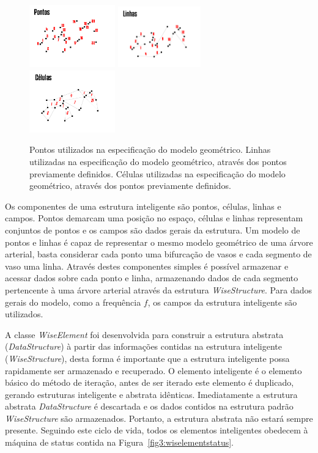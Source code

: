 \documentclass[a4paper,12pt]{monografia}
\theoremstyle{plain}
\theoremstyle{definition}
\theoremstyle{remark}
\begin{document}
\begin{figure}[!htbp]
	\includegraphics[width=0.33\textwidth]{Figures/WiseElementPoints.png}
	\includegraphics[width=0.32\textwidth]{Figures/WiseElementLines.png}
	\includegraphics[width=0.33\textwidth]{Figures/WiseElementCells.png}
	\caption{Pontos utilizados na especificação do modelo geométrico. Linhas utilizadas na especificação do modelo geométrico, através dos pontos previamente definidos. Células utilizadas na especificação do modelo geométrico, através dos pontos previamente definidos.}
	\label{fig2:wiselementstructs}
\end{figure}

Os componentes de uma estrutura inteligente são pontos, células, linhas e campos. Pontos demarcam uma posição no espaço, células e linhas representam conjuntos de pontos e os campos são dados gerais da estrutura. Um modelo de pontos e linhas é capaz de representar o mesmo modelo geométrico de uma árvore arterial, basta considerar cada ponto uma bifurcação de vasos e cada segmento de vaso uma linha. Através destes componentes simples é possível armazenar e acessar dados sobre cada ponto e linha, armazenando dados de cada segmento pertencente à uma árvore arterial através da estrutura \textit{WiseStructure}. Para dados gerais do modelo, como a frequência $f$, os campos da estrutura inteligente são utilizados.

A classe \textit{WiseElement} foi desenvolvida para construir a estrutura abstrata (\textit{DataStructure}) à partir das informações contidas na estrutura inteligente (\textit{WiseStructure}), desta forma é importante que a estrutura inteligente possa rapidamente ser armazenado e recuperado. O elemento inteligente é o elemento básico do método de iteração, antes de ser iterado este elemento é duplicado, gerando estruturas inteligente e abstrata idênticas. Imediatamente a estrutura abstrata \textit{DataStructure} é descartada e os dados contidos na estrutura padrão \textit{WiseStructure} são armazenados. Portanto, a estrutura abstrata não estará sempre presente. Seguindo este ciclo de vida, todos os elementos inteligentes obedecem à máquina de status contida na Figura~\ref{fig3:wiselementstatus}.
\end{document}
